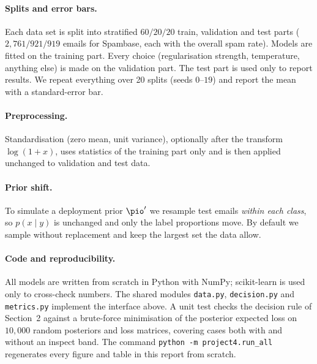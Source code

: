 \paragraph{Splits and error bars.}
Each data set is split into stratified $60/20/20$ train, validation and test parts
($2{,}761/921/919$ emails for Spambase, each with the overall spam rate). Models are fitted on the
training part. Every choice (regularisation strength, temperature, anything else) is made on the
validation part. The test part is used only to report results. We repeat everything over 20 splits
(seeds $0$--$19$) and report the mean with a standard-error bar.

\paragraph{Preprocessing.}
Standardisation (zero mean, unit variance), optionally after the transform $\log(1+x)$, uses
statistics of the training part only and is then applied unchanged to validation and test data.

\paragraph{Prior shift.}
To simulate a deployment prior $\pio'$ we resample test emails \emph{within each class}, so
$p(x\mid y)$ is unchanged and only the label proportions move. By default we sample without
replacement and keep the largest set the data allow.

\paragraph{Code and reproducibility.}
All models are written from scratch in Python with NumPy; scikit-learn is used only to cross-check
numbers. The shared modules \texttt{data.py}, \texttt{decision.py} and \texttt{metrics.py} implement
the interface above. A unit test checks the decision rule of Section~2 against a brute-force
minimisation of the posterior expected loss on $10{,}000$ random posteriors and loss matrices,
covering cases both with and without an inspect band. The command
\texttt{python -m project4.run\_all} regenerates every figure and table in this report from scratch.
